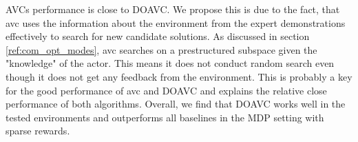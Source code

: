 AVCs performance is close to DOAVC. We propose this is due to the fact, that \ac{avc} uses the information about the environment 
from the expert demonstrations effectively to search for new candidate solutions. As discussed in section \ref{ref:com_opt_modes}, \ac{avc} searches on a prestructured subspace given the "knowledge" of the 
actor. This means it does not conduct random search even though it does not get any feedback from the environment. This is probably a key for the good performance of \ac{avc} and DOAVC and explains 
the relative close performance of both algorithms. Overall, we find that DOAVC works well in the tested environments and outperforms all baselines in the MDP setting with sparse rewards.